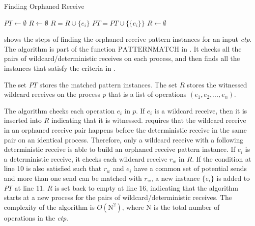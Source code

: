 \begin{algorithm}
\caption{Finding Orphaned Receive}\label{algo:mismatch}
\begin{algorithmic}[1]
\State $\mathit{PT} \gets \emptyset$
\State $\mathit{R} \gets \emptyset$
\State $\mathit{R} = \mathit{R} \cup \{e_i\}$
\EndIf
{}
\State $\mathit{PT} = \mathit{PT} \cup \{\{e_i\}\}$
\EndIf
\EndFor
\EndIf
\EndFor
\State $\mathit{R} \gets \emptyset$
\EndFor
\end{algorithmic}
\end{algorithm}

 shows the steps of finding the orphaned receive pattern instances for an input \textit{ctp}. The algorithm is part of the function $\mathrm{PATTERNMATCH}$ in .  
It checks all the pairs of wildcard/deterministic receives on each process, and then finds all the instances that satisfy the criteria in . 

The set $\mathit{PT}$ stores the matched pattern instances.
The set $\mathit{R}$ stores the witnessed wildcard receives on the process \textit{p} that is a list of operations $(e_1, e_2, \dots, e_n)$. 

The algorithm checks each operation $e_i$ in $p$. If $e_i$ is a wildcard receive, then it is inserted into $\mathit{R}$ indicating that it is witnessed.  requires that the wildcard receive in an orphaned receive pair happens before the deterministic receive in the same pair on an identical process. Therefore, only a wildcard receive with a following deterministic receive is able to build an orphaned receive pattern instance. If $e_i$ is a deterministic receive, it checks each wildcard receive $r_w$ in $\mathit{R}$. If the condition at line 10 is also satisfied such that $r_w$ and $e_i$ have a common set of potential sends and more than one send can be matched with $r_w$, a new instance $\{e_i\}$ is added to $\mathit{PT}$ at line 11. $R$ is set back to empty at line 16, indicating that the algorithm starts at a new process for the pairs of wildcard/deterministic receives.
The complexity of the algorithm is $O(\mathrm{N}^2)$, where $\mathrm{N}$ is the total number of operations in the \textit{ctp}. 

